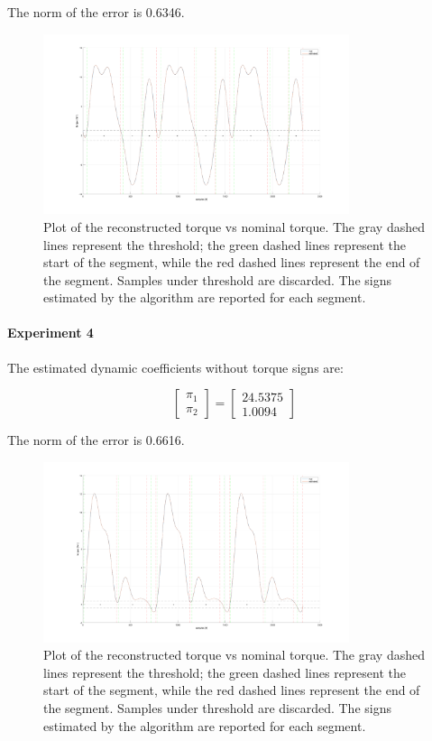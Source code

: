 \documentclass{article}
\begin{document}
The norm of the error is 0.6346.

\begin{figure}[!htbp]
\centering
\includegraphics[width=0.8\textwidth]{images/1-dof/results_experiment3.png}
\caption{Plot of the reconstructed torque vs nominal torque. The gray dashed lines represent the threshold; the green dashed lines represent the start of the segment, while the red dashed lines represent the end of the segment. Samples under threshold are discarded. The signs estimated by the algorithm are reported for each segment.}
\end{figure}
\FloatBarrier

\paragraph{Experiment 4} The estimated dynamic coefficients without torque signs are:

\[\begin{bmatrix}
\pi_1  \\ \pi_2 
\end{bmatrix}=\begin{bmatrix}
24.5375 \\ 1.0094
\end{bmatrix}\]

The norm of the error is 0.6616.

\begin{figure}[!htbp]
\centering
\includegraphics[width=0.8\textwidth]{images/1-dof/results_experiment4.png}
\caption{Plot of the reconstructed torque vs nominal torque. The gray dashed lines represent the threshold; the green dashed lines represent the start of the segment, while the red dashed lines represent the end of the segment. Samples under threshold are discarded. The signs estimated by the algorithm are reported for each segment.}
\end{figure}
\FloatBarrier
\end{document}
